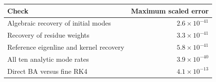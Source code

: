 \begin{center}
\begin{tabular}{lr}
\hline
Check & Maximum scaled error\\
\hline
Algebraic recovery of initial modes & $2.6\times10^{-41}$\\
Recovery of residue weights & $3.3\times10^{-41}$\\
Reference eigenline and kernel recovery & $5.8\times10^{-41}$\\
All ten analytic mode rates & $3.9\times10^{-40}$\\
Direct BA versus fine RK4 & $4.1\times10^{-13}$\\
\hline
\end{tabular}
\end{center}
